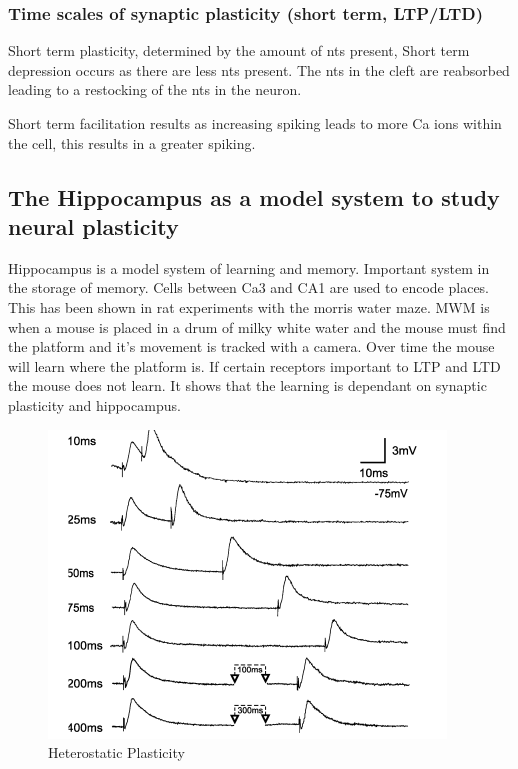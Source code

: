 \documentclass[main]{subfiles}
\begin{document}
\subsubsection{Time scales of synaptic plasticity (short term, LTP/LTD)}
Short term plasticity, determined by the amount of nts present, Short term depression occurs as there are less nts present. The nts in the cleft are reabsorbed leading to a restocking of the nts in the neuron. 

Short term facilitation results as increasing spiking leads to more Ca ions within the cell, this results in a greater spiking. 


\subsection{The Hippocampus as a model system to study neural plasticity}
Hippocampus is a model system of learning and memory. Important system in the storage of memory. Cells between Ca3 and CA1 are used to encode places. This has been shown in rat experiments with the morris water maze. MWM is when a mouse is placed in a drum of milky white water and the mouse must find the platform and it’s movement is tracked with a camera. Over time the mouse will learn where the platform is. If certain receptors important to LTP and LTD the mouse does not learn. It shows that the learning is dependant on synaptic plasticity and hippocampus.

\begin{figure}[H]
    \centering
    \includegraphics[width=.6\textwidth]{03_PlasticityInTheBrain/figures/pasted_image_9.png}
    \caption{Heterostatic Plasticity}
    \label{fig:syn_plas1t}
\end{figure}
\end{document}
